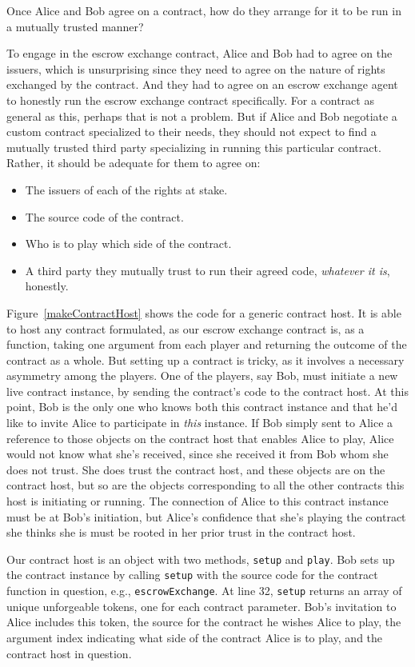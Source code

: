 \documentclass{llncs}
\begin{document}
Once Alice and Bob agree on a contract, how do they arrange for it to be run in a mutually trusted manner?

To engage in the escrow exchange contract, Alice and Bob had to agree on the issuers, which is unsurprising since they need to agree on the nature of rights exchanged by the contract. And they had to agree on an escrow exchange agent to honestly run the escrow exchange contract specifically. For a contract as general as this, perhaps that is not a problem. But if Alice and Bob negotiate a custom contract specialized to their needs, they should not expect to find a mutually trusted third party specializing in running this particular contract. Rather, it should be adequate for them to agree on:

\begin{itemize}
\item The issuers of each of the rights at stake.
\item The source code of the contract.
\item Who is to play which side of the contract.
\item A third party they mutually trust to run their agreed code, \emph{whatever it is}, honestly.
\end{itemize}

Figure~\ref{makeContractHost} shows the code for a generic contract host. It is able to host any contract formulated, as our escrow exchange contract is, as a function, taking one argument from each player and returning the outcome of the contract as a whole. But setting up a contract is tricky, as it involves a necessary asymmetry among the players. One of the players, say Bob, must initiate a new live contract instance, by sending the contract's code to the contract host. At this point, Bob is the only one who knows both this contract instance and that he'd like to invite Alice to participate in \emph{this} instance. If Bob simply sent to Alice a reference to those objects on the contract host that enables Alice to play, Alice would not know what she's received, since she received it from Bob whom she does not trust. She does trust the contract host, and these objects are on the contract host, but so are the objects corresponding to all the other contracts this host is initiating or running. The connection of Alice to this contract instance must be at Bob's initiation, but Alice's confidence that she's playing the contract she thinks she is must be rooted in her prior trust in the contract host.

Our contract host is an object with two methods, {\tt setup} and {\tt play}. Bob sets up the contract instance by calling {\tt setup} with the source code for the contract function in question, e.g., {\tt escrowExchange}. At line 32, {\tt setup} returns an array of unique unforgeable tokens, one for each contract parameter. Bob's invitation to Alice includes this token, the source for the contract he wishes Alice to play, the argument index indicating what side of the contract Alice is to play, and the contract host in question.
\end{document}
